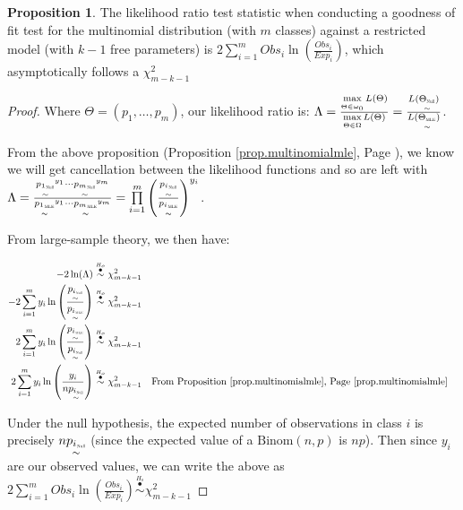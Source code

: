 \documentclass[12pt, letterpaper]{article}
\theoremstyle{definition}
\newtheorem{prop}{Proposition}[theorem]
\numberwithin{equation}{section}
\newcommand{\myprop}[1]{(Proposition \ref{#1}, Page \pageref{#1})}
\newcommand{\+}[1]{+_{\scalebox{.375}{#1}}}
\newcommand{\mle}[1]{\underset{\sim}{#1_{\scalebox{0.35}{MLE}}}}
\newcommand{\1}{\mathbbm{1}}
\begin{document}
\newpage
{}
\begin{prop}\label{prop.lrtforgof}
	The likelihood ratio test statistic when conducting a goodness of fit test for the multinomial distribution (with $m$ classes) against a restricted model (with $k-1$ free parameters) is $2\sum\limits_{i=1}^{m}Obs_i\ln\left(\frac{Obs_i}{Exp_i}\right)$, which asymptotically follows a $\chi^2_{m-k-1}$
		
	\begin{proof}	
		Where $\Theta=(p_1, \dots, p_m)$, our likelihood ratio is: $\Lambda=\frac{\max\limits_{\Theta \in \omega_0}L(\Theta)}{\max\limits_{\Theta \in \Omega}L(\Theta)}=\frac{L(\underset{\sim}{\Theta_{\scalebox{.35}{Null}}})}{L(\mle\Theta)}$.
		\vspace{\baselineskip}
		
		From the above proposition \myprop{prop.multinomialmle}, we know we will get cancellation between the likelihood functions and so are left with $\Lambda=\frac{\underset{\sim}{{p_1}_{\scalebox{.35}{Null}}}^{y_1}\cdots \underset{\sim}{{p_m}_{\scalebox{.35}{Null}}}^{y_m}}{\underset{\sim}{{p_1}_{\scalebox{.35}{MLE}}}^{y_1}\cdots \underset{\sim}{{p_m}_{\scalebox{.35}{MLE}}}^{y_m}}=\prod\limits_{i=1}^{m}\left(\frac{\underset{\sim}{{p_i}_{\scalebox{.35}{Null}}}}{\underset{\sim}{{p_i}_{\scalebox{.35}{MLE}}}}\right)^{y_i}$.
		\vspace{\baselineskip}
		
		From large-sample theory, we then have:
		
		\vspace{-0.5cm}
		\begin{align*}
			-2\ln(\Lambda) &\stackrel{\stackrel{H_o}{\bullet}}{\sim} \chi^2_{m-k-1}\\
			-2\sum\limits_{i=1}^{m}y_i\ln\left(\frac{\underset{\sim}{{p_i}_{\scalebox{.35}{Null}}}}{\underset{\sim}{{p_i}_{\scalebox{.35}{MLE}}}}\right) &\stackrel{\stackrel{H_o}{\bullet}}{\sim} \chi^2_{m-k-1}\\
			2\sum\limits_{i=1}^{m}y_i\ln\left(\frac{\underset{\sim}{{p_i}_{\scalebox{.35}{MLE}}}}{\underset{\sim}{{p_i}_{\scalebox{.35}{Null}}}}\right) &\stackrel{\stackrel{H_o}{\bullet}}{\sim} \chi^2_{m-k-1}\\
			2\sum\limits_{i=1}^{m}y_i\ln\left(\frac{y_i}{n\underset{\sim}{{p_i}_{\scalebox{.35}{Null}}}}\right) &\stackrel{\stackrel{H_o}{\bullet}}{\sim} \chi^2_{m-k-1} &&\text{From Proposition \ref{prop.multinomialmle}, Page \pageref{prop.multinomialmle}}\\			
		\end{align*}
	
		Under the null hypothesis, the expected number of observations in class $i$ is precisely $n\underset{\sim}{{p_i}_{\scalebox{.35}{Null}}}$  (since the expected value of a $\text{Binom}(n,p)$ is $np$). Then since $y_i$ are our observed values, we can write the above as $2\sum\limits_{i=1}^{m}Obs_i\ln\left(\frac{Obs_i}{Exp_i}\right)\stackrel{\stackrel{H_o}{\bullet}}{\sim} \chi^2_{m-k-1}$
	\end{proof}
\end{prop}
\end{document}
